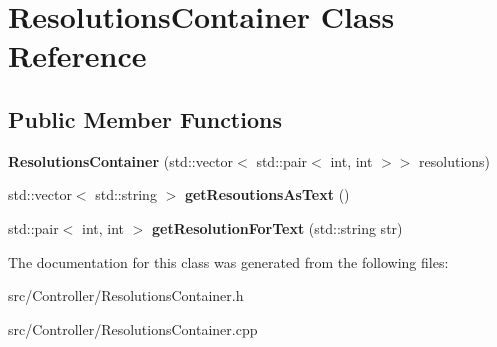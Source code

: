 \hypertarget{classResolutionsContainer}{}\section{Resolutions\+Container Class Reference}
\label{classResolutionsContainer}
\subsection*{Public Member Functions}
\begin{DoxyCompactItemize}
\item 
{\bfseries Resolutions\+Container} (std\+::vector$<$ std\+::pair$<$ int, int $>$$>$ resolutions)\hypertarget{classResolutionsContainer_a240ca7b07c77e40ceb42077433be384a}{}\label{classResolutionsContainer_a240ca7b07c77e40ceb42077433be384a}

\item 
std\+::vector$<$ std\+::string $>$ {\bfseries get\+Resoutions\+As\+Text} ()\hypertarget{classResolutionsContainer_a5b9e25fb7358f67422e09fc5f65b081e}{}\label{classResolutionsContainer_a5b9e25fb7358f67422e09fc5f65b081e}

\item 
std\+::pair$<$ int, int $>$ {\bfseries get\+Resolution\+For\+Text} (std\+::string str)\hypertarget{classResolutionsContainer_a946ef920dd6edda52abd859bad0ba1e6}{}\label{classResolutionsContainer_a946ef920dd6edda52abd859bad0ba1e6}

\end{DoxyCompactItemize}


The documentation for this class was generated from the following files\+:\begin{DoxyCompactItemize}
\item 
src/\+Controller/Resolutions\+Container.\+h\item 
src/\+Controller/Resolutions\+Container.\+cpp\end{DoxyCompactItemize}
